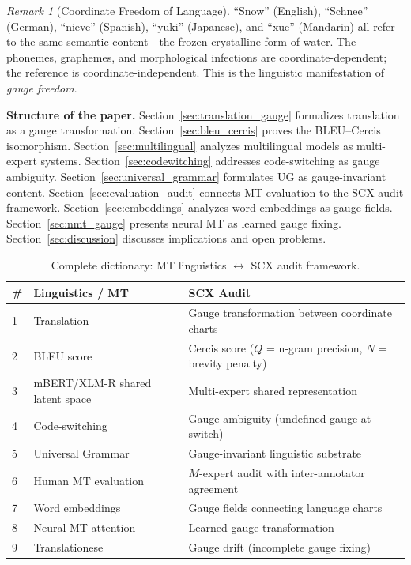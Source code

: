 \documentclass[12pt,a4paper]{article}
\theoremstyle{remark}
\newtheorem{remark}[theorem]{Remark}
\newcommand{\SCX}{\textsf{SCX}}
\newcommand{\Cercis}{\textsf{Cercis}}
\begin{document}
\begin{remark}[Coordinate Freedom of Language]
\label{rem:coordinate_freedom}
``Snow'' (English), ``Schnee'' (German), ``nieve'' (Spanish), ``yuki'' (Japanese),
and ``xue'' (Mandarin) all refer to the same semantic content---the frozen
crystalline form of water. The phonemes, graphemes, and morphological
infections are coordinate-dependent; the reference is coordinate-independent.
This is the linguistic manifestation of \emph{gauge freedom}.
\end{remark}

\medskip
\noindent\textbf{Structure of the paper.}
Section~\ref{sec:translation_gauge} formalizes translation as a gauge
transformation. Section~\ref{sec:bleu_cercis} proves the BLEU--Cercis
isomorphism. Section~\ref{sec:multilingual} analyzes multilingual models
as multi-expert systems. Section~\ref{sec:codewitching} addresses
code-switching as gauge ambiguity. Section~\ref{sec:universal_grammar}
formulates UG as gauge-invariant content. Section~\ref{sec:evaluation_audit}
connects MT evaluation to the \SCX{} audit framework. Section~\ref{sec:embeddings}
analyzes word embeddings as gauge fields. Section~\ref{sec:nmt_gauge}
presents neural MT as learned gauge fixing. Section~\ref{sec:discussion}
discusses implications and open problems.

\begin{table}[H]
\centering
\caption{Complete dictionary: MT linguistics $\leftrightarrow$ SCX audit framework.}
\label{tab:mappings}
\begin{tabular}{@{}lll@{}}
\toprule
\textbf{\#} & \textbf{Linguistics / MT} & \textbf{SCX Audit} \\
\midrule
1 & Translation & Gauge transformation between coordinate charts \\
2 & BLEU score & \Cercis{} score ($Q$ = n-gram precision, $N$ = brevity penalty) \\
3 & mBERT/XLM-R shared latent space & Multi-expert shared representation \\
4 & Code-switching & Gauge ambiguity (undefined gauge at switch) \\
5 & Universal Grammar & Gauge-invariant linguistic substrate \\
6 & Human MT evaluation & $M$-expert audit with inter-annotator agreement \\
7 & Word embeddings & Gauge fields connecting language charts \\
8 & Neural MT attention & Learned gauge transformation \\
9 & Translationese & Gauge drift (incomplete gauge fixing) \\
\bottomrule
\end{tabular}
\end{table}
\end{document}
